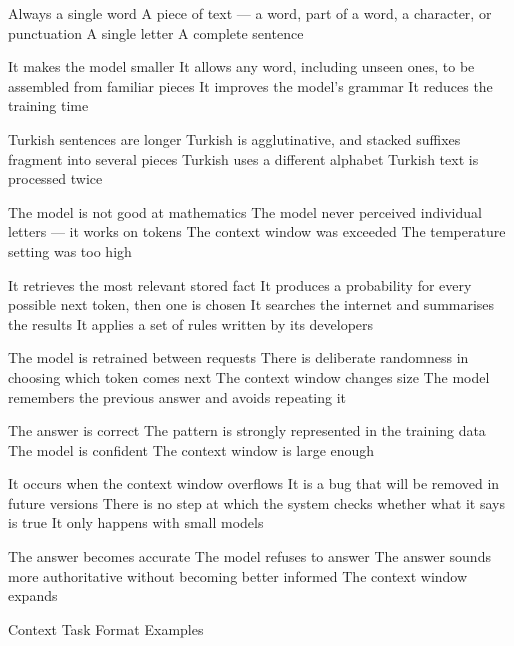 \documentclass[11pt,a4paper]{article}
\begin{document}

\begin{questions}

  {Always a single word}
  {A piece of text --- a word, part of a word, a character, or punctuation}
  {A single letter}
  {A complete sentence}

  {It makes the model smaller}
  {It allows any word, including unseen ones, to be assembled from familiar pieces}
  {It improves the model's grammar}
  {It reduces the training time}

  {Turkish sentences are longer}
  {Turkish is agglutinative, and stacked suffixes fragment into several pieces}
  {Turkish uses a different alphabet}
  {Turkish text is processed twice}

  {The model is not good at mathematics}
  {The model never perceived individual letters --- it works on tokens}
  {The context window was exceeded}
  {The temperature setting was too high}

  {It retrieves the most relevant stored fact}
  {It produces a probability for every possible next token, then one is chosen}
  {It searches the internet and summarises the results}
  {It applies a set of rules written by its developers}

  {The model is retrained between requests}
  {There is deliberate randomness in choosing which token comes next}
  {The context window changes size}
  {The model remembers the previous answer and avoids repeating it}

  {The answer is correct}
  {The pattern is strongly represented in the training data}
  {The model is confident}
  {The context window is large enough}

  {It occurs when the context window overflows}
  {It is a bug that will be removed in future versions}
  {There is no step at which the system checks whether what it says is true}
  {It only happens with small models}

  {The answer becomes accurate}
  {The model refuses to answer}
  {The answer sounds more authoritative without becoming better informed}
  {The context window expands}

  {Context}
  {Task}
  {Format}
  {Examples}

\end{questions}
\end{document}
